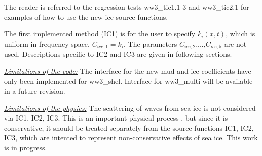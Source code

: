 The reader is referred to the regression tests {\file ww3\_tic1.1-3} and
{\file ww3\_tic2.1} for examples of how to use the new ice source functions.

The first implemented method ({\code IC1}) is for the user to specify
${k_i(x,t)}$, which is uniform in frequency space, ${C_{ice,1}}={k_i}$. The
parameters ${C_{ice,2}}$,...,${C_{ice,5}}$ are not used. Descriptions specific
to IC2 and IC3 are given in following sections.

\textrm{\textit{\underline{Limitations of the code:}}} The interface for the
new mud and ice coefficients have only been implemented for {\file
ww3\_shel}. Interface for {\file ww3\_multi} will be available in a future
revision.  

\textrm{\textit{\underline{Limitations of the physics:}}} The
scattering of waves from sea ice is not considered via {\code IC1}, {\code
IC2}, {\code IC3}. This is an important physical process \citep{art:Wad75},
but since it is conservative, it should be treated separately from the source
functions {\code IC1}, {\code IC2}, {\code IC3}, which are intented to
represent non-conservative effects of sea ice. This work is in progress.
